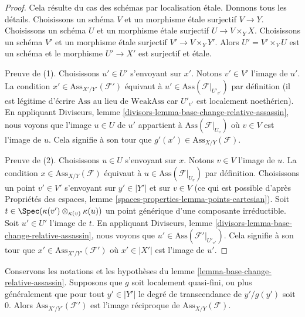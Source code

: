 \begin{proof}
Cela résulte du cas des schémas par localisation \'etale.
Donnons tous les détails. Choisissons un schéma
$V$ et un morphisme \'etale surjectif $V \to Y$.
Choisissons un schéma $U$ et un morphisme
\'etale surjectif $U \to V \times_Y X$. Choisissons un schéma $V'$
et un morphisme \'etale surjectif $V' \to V \times_Y Y'$.
Alors $U' = V' \times_V U$ est un schéma et le morphisme
$U' \to X'$ est surjectif et \'etale.

\medskip\noindent
Preuve de (1). Choisissons $u' \in U'$ s'envoyant sur $x'$.
Notons $v' \in V'$ l'image de $u'$.
La condition $x' \in \text{Ass}_{X'/Y'}(\mathcal{F}')$ équivaut
à $u' \in \text{Ass}(\mathcal{F}|_{U'_{v'}})$
par définition (il est légitime d'écrire $\text{Ass}$ au lieu de $\text{WeakAss}$
car $U'_{v'}$ est localement noethérien).
En appliquant Diviseurs, lemme \ref{divisors-lemma-base-change-relative-assassin},
nous voyons que l'image $u \in U$ de $u'$ appartient à
$\text{Ass}(\mathcal{F}|_{U_v})$ où $v \in V$ est l'image de $u$.
Cela signifie à son tour que $g'(x') \in \text{Ass}_{X/Y}(\mathcal{F})$.

\medskip\noindent
Preuve de (2). Choisissons $u \in U$ s'envoyant sur $x$.
Notons $v \in V$ l'image de $u$.
La condition $x \in \text{Ass}_{X/Y}(\mathcal{F})$ équivaut
à $u \in \text{Ass}(\mathcal{F}|_{U_v})$
par définition. Choisissons un point $v' \in V'$ s'envoyant
sur $y' \in |Y'|$ et sur $v \in V$ (ce qui est possible d'après
Propriétés des espaces, lemme \ref{spaces-properties-lemma-points-cartesian}).
Soit $t \in \Spec(\kappa(v') \otimes_{\kappa(v)} \kappa(u))$
un point générique d'une composante irréductible.
Soit $u' \in U'$ l'image de $t$.
En appliquant Diviseurs, lemme \ref{divisors-lemma-base-change-relative-assassin},
nous voyons que $u' \in \text{Ass}(\mathcal{F}'|_{U'_{v'}})$.
Cela signifie à son tour que $x' \in \text{Ass}_{X'/Y'}(\mathcal{F}')$
où $x' \in |X'|$ est l'image de $u'$.
\end{proof}

\begin{lemma}
\label{lemma-base-change-relative-assassin-quasi-finite}
Conservons les notations et les hypothèses du
lemme \ref{lemma-base-change-relative-assassin}.
Supposons que $g$ soit localement quasi-fini, ou plus généralement que
pour tout $y' \in |Y'|$ le degré de transcendance de $y'/g(y')$ soit $0$.
Alors $\text{Ass}_{X'/Y'}(\mathcal{F}')$ est l'image réciproque de
$\text{Ass}_{X/Y}(\mathcal{F})$.
\end{lemma}

